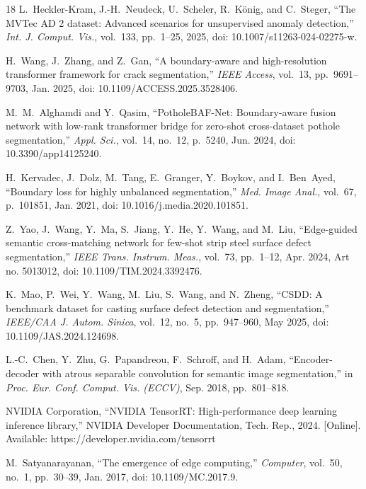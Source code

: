 \documentclass{ieeeaccess}
\begin{document}
\begin{thebibliography}{18}
L.~Heckler-Kram, J.-H.~Neudeck, U.~Scheler, R.~K{\"o}nig, and C.~Steger, ``The MVTec AD 2 dataset: Advanced scenarios for unsupervised anomaly detection,'' \emph{Int. J. Comput. Vis.}, vol.~133, pp.~1--25, 2025, doi: 10.1007/s11263-024-02275-w.

H.~Wang, J.~Zhang, and Z.~Gan, ``A boundary-aware and high-resolution transformer framework for crack segmentation,'' \emph{IEEE Access}, vol.~13, pp.~9691--9703, Jan. 2025, doi: 10.1109/ACCESS.2025.3528406.

M.~M.~Alghamdi and Y.~Qasim, ``PotholeBAF-Net: Boundary-aware fusion network with low-rank transformer bridge for zero-shot cross-dataset pothole segmentation,'' \emph{Appl. Sci.}, vol.~14, no.~12, p.~5240, Jun. 2024, doi: 10.3390/app14125240.

H.~Kervadec, J.~Dolz, M.~Tang, E.~Granger, Y.~Boykov, and I.~Ben~Ayed, ``Boundary loss for highly unbalanced segmentation,'' \emph{Med. Image Anal.}, vol.~67, p.~101851, Jan. 2021, doi: 10.1016/j.media.2020.101851.

Z.~Yao, J.~Wang, Y.~Ma, S.~Jiang, Y.~He, Y.~Wang, and M.~Liu, ``Edge-guided semantic cross-matching network for few-shot strip steel surface defect segmentation,'' \emph{IEEE Trans. Instrum. Meas.}, vol.~73, pp.~1--12, Apr. 2024, Art no. 5013012, doi: 10.1109/TIM.2024.3392476.

K.~Mao, P.~Wei, Y.~Wang, M.~Liu, S.~Wang, and N.~Zheng, ``CSDD: A benchmark dataset for casting surface defect detection and segmentation,'' \emph{IEEE/CAA J. Autom. Sinica}, vol.~12, no.~5, pp.~947--960, May 2025, doi: 10.1109/JAS.2024.124698.

L.-C.~Chen, Y.~Zhu, G.~Papandreou, F.~Schroff, and H.~Adam, ``Encoder-decoder with atrous separable convolution for semantic image segmentation,'' in \emph{Proc. Eur. Conf. Comput. Vis. (ECCV)}, Sep. 2018, pp.~801--818.

NVIDIA Corporation, ``NVIDIA TensorRT: High-performance deep learning inference library,'' NVIDIA Developer Documentation, Tech. Rep., 2024. [Online]. Available: https://developer.nvidia.com/tensorrt

M.~Satyanarayanan, ``The emergence of edge computing,'' \emph{Computer}, vol.~50, no.~1, pp.~30--39, Jan. 2017, doi: 10.1109/MC.2017.9.
\end{thebibliography}

\EOD
\end{document}
